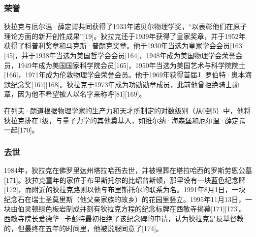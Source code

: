 \subsubsection{荣誉}  
狄拉克与厄尔温·薛定谔共同获得了1933年诺贝尔物理学奖，“以表彰他们在原子理论方面的新开创性成果”[19]。狄拉克还于1939年获得了皇家奖章，并于1952年获得了科普利奖章和马克斯·普朗克奖章。他于1930年当选为皇家学会会员[163][45]，并于1938年当选为美国哲学会会员[164]，1948年成为美国物理学会荣誉会员，1949年成为美国国家科学院会员[165]，1950年当选为美国艺术与科学院院士[166]，1971年成为伦敦物理学会荣誉会员。他于1969年获得首届J. 罗伯特·奥本海默纪念奖[167][168]。狄拉克于1973年成为功勋勋章成员，此前他曾拒绝骑士勋章，因为他不希望被人以名字来称呼[81][169]。

在列夫·朗道根据物理学家的生产力和天才所制定的对数级别（从0到5）中，他将狄拉克排在1级，与量子力学的其他奠基人，如维尔纳·海森堡和厄尔温·薛定谔一起[170]。
\subsubsection{去世}

1984年，狄拉克在佛罗里达州塔拉哈西去世，并被埋葬在塔拉哈西的罗斯劳恩公墓[171]。狄拉克童年的家位于布里斯托尔的比绍普斯顿，那里设有一块蓝色纪念牌[172]，而附近的狄拉克路则以他与布里斯托尔的联系为名。1991年8月1日，一块纪念石在瑞士圣莫里斯（他父亲家族的故乡）的花园里竖立。1995年11月13日，一块由伯灵顿绿色板岩制成并刻有狄拉克方程的纪念标牌在西敏寺揭幕[171][173]。西敏寺院长爱德华·卡彭特最初拒绝了该纪念碑的申请，认为狄拉克是反基督教的，但最终在五年的时间里，他被说服同意了[174]。